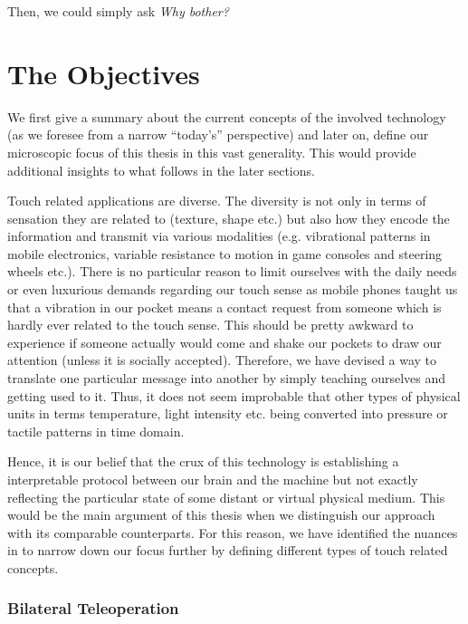 Then, we could simply ask \emph{Why bother?} 


\section{The Objectives}
\label{sec:intro:obj}

We first give a summary about the current concepts of the involved technology (as we foresee from a narrow \enquote{today's} perspective) and later on, define our microscopic focus of this thesis in this vast generality. This would provide additional insights to what follows in the later sections.  


Touch related applications are diverse. The diversity is not only in terms of sensation they are related to (texture, shape etc.) but also how they encode the information and transmit via various modalities (e.g. vibrational patterns in mobile electronics, variable resistance to motion in game consoles and steering wheels etc.). There is no particular reason to limit ourselves with the daily needs or even luxurious demands regarding our touch sense as mobile phones taught us that a vibration in our pocket means a contact request from someone which is hardly ever related to the touch sense. This should be pretty awkward to experience if someone actually would come and shake our pockets to draw our attention (unless it is socially accepted). Therefore, we have devised a way to translate one particular message into another by simply teaching ourselves and getting used to it. Thus, it does not seem improbable that other types of physical units in terms temperature, light intensity etc. being converted into pressure or tactile patterns in time domain.

Hence, it is our belief that the crux of this technology is establishing a interpretable protocol between our brain and the machine but not exactly reflecting the particular state of some distant or virtual physical medium. 
This would be the main argument of this thesis when we distinguish our approach with its comparable counterparts. For this reason, we have identified the nuances in  to narrow down our focus further by defining different types of touch related concepts.



\subsubsection{Bilateral Teleoperation}

